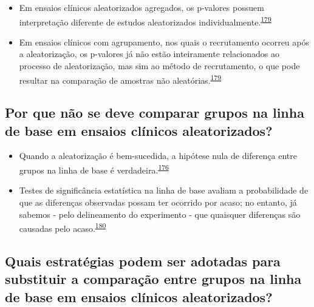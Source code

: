 \documentclass[
  a4paper,
]{book}
\begin{document}
\begin{itemize}
\item
  Em ensaios clínicos aleatorizados agregados, os p-valores possuem interpretação diferente de estudos aleatorizados individualmente.\textsuperscript{\protect\hyperlink{ref-Bolzern2019}{179}}
\item
  Em ensaios clínicos com agrupamento, nos quais o recrutamento ocorreu após a aleatorização, os p-valores já não estão inteiramente relacionados ao processo de aleatorização, mas sim ao método de recrutamento, o que pode resultar na comparação de amostras não aleatórias.\textsuperscript{\protect\hyperlink{ref-Bolzern2019}{179}}
\end{itemize}

\hypertarget{por-que-nuxe3o-se-deve-comparar-grupos-na-linha-de-base-em-ensaios-cluxednicos-aleatorizados}{%
\subsection{Por que não se deve comparar grupos na linha de base em ensaios clínicos aleatorizados?}\label{por-que-nuxe3o-se-deve-comparar-grupos-na-linha-de-base-em-ensaios-cluxednicos-aleatorizados}}

\begin{itemize}
\item
  Quando a aleatorização é bem-sucedida, a hipótese nula de diferença entre grupos na linha de base é verdadeira.\textsuperscript{\protect\hyperlink{ref-roberts1999}{176}}
\item
  Testes de significância estatística na linha de base avaliam a probabilidade de que as diferenças observadas possam ter ocorrido por acaso; no entanto, já sabemos - pelo delineamento do experimento - que quaisquer diferenças são causadas pelo acaso.\textsuperscript{\protect\hyperlink{ref-gruijters2020}{180}}
\end{itemize}

\hypertarget{quais-estratuxe9gias-podem-ser-adotadas-para-substituir-a-comparauxe7uxe3o-entre-grupos-na-linha-de-base-em-ensaios-cluxednicos-aleatorizados}{%
\subsection{Quais estratégias podem ser adotadas para substituir a comparação entre grupos na linha de base em ensaios clínicos aleatorizados?}\label{quais-estratuxe9gias-podem-ser-adotadas-para-substituir-a-comparauxe7uxe3o-entre-grupos-na-linha-de-base-em-ensaios-cluxednicos-aleatorizados}}
\end{document}
